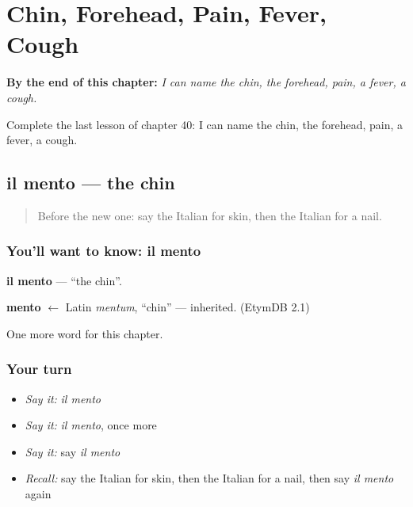 
\chapter{Chin, Forehead, Pain, Fever, Cough}
\label{ch:it-chin-forehead-pain-fever-cough}

\begin{chapteropening}
\textbf{By the end of this chapter:} \emph{I can name the chin, the forehead, pain, a fever, a cough.}

Complete the last lesson of chapter 40: I can name the chin, the forehead, pain, a fever, a cough.
\end{chapteropening}

\section[il mento]{il mento — the chin}

\label{lesson:IT-C40-mento}



\begin{quote}
Before the new one: say the Italian for skin, then the Italian for a nail.
\end{quote}

\subsection*{You'll want to know: il mento}
\textbf{il mento} — \textquotedblleft{}the chin\textquotedblright{}.

\begin{cousinweb}
\textbf{mento} $\leftarrow$ Latin \emph{mentum}, \textquotedblleft{}chin\textquotedblright{} — inherited. (EtymDB 2.1)
\end{cousinweb}

\begin{grammarlens}[title={What you've built}]
One more word for this chapter.
\end{grammarlens}

\subsection*{Your turn}
\begin{itemize}
\raggedright
  \item \emph{Say it:} \emph{il mento}
  \item \emph{Say it:} \emph{il mento}, once more
  \item \emph{Say it:} say \emph{il mento}
  \item \emph{Recall:} say the Italian for skin, then the Italian for a nail, then say \emph{il mento} again
\end{itemize}

